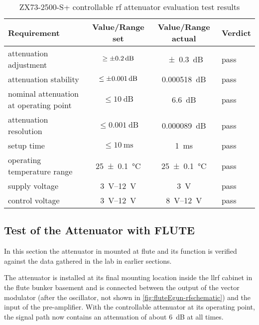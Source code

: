 \begin{table}[tbh]
\caption[Evaluation results]{ZX73-2500-S+ controllable \gls{rf} attenuator evaluation test results}
\label{tab:interfacingFlute_rfattenrequirements_result}
\centering
\begin{tabular}{lccl}
	\toprule
	Requirement                            &      {Value/Range} set      &  {Value/Range} actual   & Verdict \\ \midrule
	attenuation adjustment                 &    $\ge\SI{\pm0.2}{\dB}$    &    \SI{\pm0.3}{\dB}     & pass    \\
	attenuation stability                  &   $\le\SI{\pm0.001}{\dB}$   &   \SI{0.000518}{\dB}    & pass    \\
	nominal attenuation at operating point &      $\le\SI{10}{\dB}$      &      \SI{6.6}{\dB}      & pass    \\
	attenuation resolution                 &    $\le\SI{0.001}{\dB}$     &   \SI{0.000089}{\dB}    & pass    \\
	setup time                             & $\le\SI{10}{\milli\second}$ &       \SI{1}{\ms}       & pass    \\
	operating temperature range            &   \SI{25\pm0.1}{\celsius}   & \SI{25\pm0.1}{\celsius} & pass    \\
	supply voltage                         &   \SIrange{3}{12}{\volt}    &      \SI{3}{\volt}      & pass    \\
	control voltage                        &   \SIrange{3}{12}{\volt}    & \SIrange{8}{12}{\volt}  & pass    \\ \bottomrule
\end{tabular}
\end{table}

\subsection{Test of the Attenuator with FLUTE}
In this section the attenuator in mounted at \gls{flute} and its function is verified against the data gathered in the lab in earlier sections.

The attenuator is installed at its final mounting location inside the \gls{llrf} cabinet in the \gls{flute} bunker basement and is connected between the output of the vector modulator (after the oscillator, not shown in \autoref{fig:fluteEgun-rfschematic}) and the input of the pre-amplifier. With the controllable attenuator at its operating point, the signal path now contains an attenuation of about \SI{6}{\dB} at all times.

